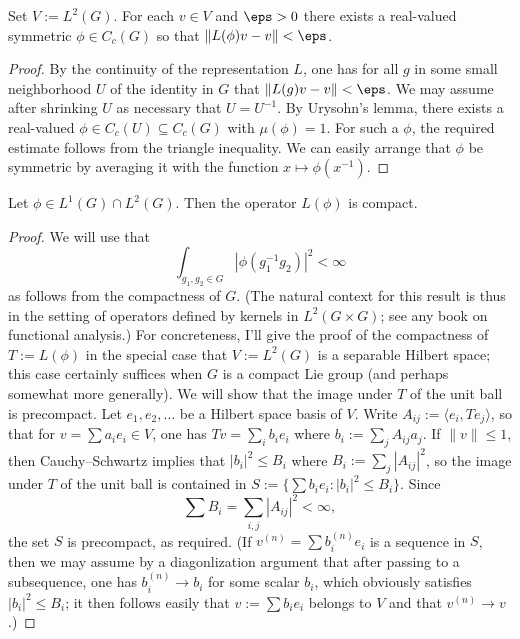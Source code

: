 \documentclass[reqno]{amsart} 
\begin{document}
\begin{lemma}\label{lem:approximate-vectors-by-convolutions}
  Set $V := L^2(G)$.
  For each $v \in V$ and $\eps > 0$
  there exists a real-valued symmetric $\phi \in C_c(G)$ so that
  $\|L(\phi) v - v \| < \eps$.
\end{lemma}
\begin{proof}
  By the continuity of the representation $L$,
  one has for all $g$ in some small neighborhood
  $U$ of the identity
  in $G$ that $\|L(g) v - v \| < \eps$.
  We may assume after shrinking $U$ as necessary that $U = U^{-1}$.
  By Urysohn's lemma,
  there exists a real-valued $\phi \in C_c(U) \subseteq C_c(G)$
  with $\mu(\phi) = 1$.
  For such a $\phi$, the required estimate follows
  from the triangle inequality.
  We can easily arrange that $\phi$ be symmetric
  by averaging it with the function $x \mapsto \phi(x^{-1})$.
\end{proof}

\begin{lemma}
  Let $\phi \in L^1(G) \cap L^2(G)$.
  Then the operator $L(\phi)$ is compact.
\end{lemma}
\begin{proof}
  We will use that
  \begin{equation}\label{eq:kernel-is-integrable}
    \int_{g_1,g_2 \in G}
    |\phi(g_1^{-1} g_2)|^2 < \infty
  \end{equation}
  as follows from the compactness of $G$.
  (The natural context for this result is thus
  in the setting of operators defined by kernels
  in $L^2(G \times G)$; see any book on functional analysis.)
  For concreteness, I'll give the proof
  of the compactness of $T := L(\phi)$ in the special case that
  $V := L^2(G)$
  is a separable Hilbert space; this case certainly suffices
  when $G$ is a compact Lie group (and perhaps somewhat more
  generally).
  We will show that the image under $T$ of the unit ball
  is precompact.
  Let $e_1,e_2,\dotsc$ be a Hilbert space basis of $V$.
  Write $A_{i j} := \langle e_i, T e_j \rangle$,
  so that for $v = \sum a_i e_i \in V$,
  one has $T v =
  \sum_{i} b_i e_i$
  where $b_i := \sum_j A_{i j} a_j$.
  If $\|v\| \leq 1$,
  then Cauchy--Schwartz
  implies that $|b_i|^2 \leq B_i$ where $B_i := \sum_{j} |A_{i
    j}|^2$,
  so
  the image under $T$ of the unit ball
  is contained in $S := \{\sum b_i e_i : |b_i|^2 \leq B_i\}$.
  Since
  \begin{equation}\label{eq:}
    \sum B_i =  \sum_{i,j} |A_{i j}|^2 < \infty,
  \end{equation}
  the set $S$ is precompact, as required.
  (If $v^{(n)} = \sum b_i^{(n)} e_i$ is a sequence in $S$,
  then we may assume by a diagonlization argument
  that after passing to a subsequence,
  one has $b_i^{(n)} \rightarrow b_i$ for some scalar $b_i$,
  which obviously satisfies $|b_i|^2 \leq B_i$;
  it then follows easily
  that $v := \sum b_i e_i$ belongs to $V$
  and that $v^{(n)} \rightarrow v$.)
\end{proof}
\end{document}
